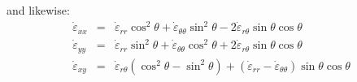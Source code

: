 and likewise:
\begin{eqnarray}
\dot{\varepsilon}_{xx} 
&=& \dot{\varepsilon}_{rr} \cos^2\theta + \dot{\varepsilon}_{\theta\theta} \sin^2\theta - 2 \dot{\varepsilon}_{r\theta} \sin\theta\cos\theta \\
\dot{\varepsilon}_{yy}
&=& \dot{\varepsilon}_{rr} \sin^2\theta + \dot{\varepsilon}_{\theta\theta} \cos^2\theta + 2 \dot{\varepsilon}_{r\theta} \sin\theta\cos\theta \\
\dot{\varepsilon}_{xy} 
&=& \dot{\varepsilon}_{r\theta} (\cos^2\theta-\sin^2\theta) + 
(\dot{\varepsilon}_{rr} - \dot{\varepsilon}_{\theta\theta})\sin\theta \cos\theta \label{ss:srboth}
\end{eqnarray}
















